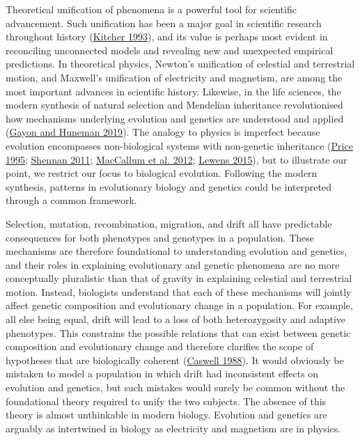 \documentclass[
]{article}
\begin{document}
Theoretical unification of phenomena is a powerful tool for scientific
advancement. Such unification has been a major goal in scientific
research throughout history (\protect\hyperlink{ref-Kitcher1993}{Kitcher
1993}), and its value is perhaps most evident in reconciling unconnected
models and revealing new and unexpected empirical predictions. In
theoretical physics, Newton's unification of celestial and terrestrial
motion, and Maxwell's unification of electricity and magnetism, are
among the most important advances in scientific history. Likewise, in
the life sciences, the modern synthesis of natural selection and
Mendelian inheritance revolutionised how mechanisms underlying evolution
and genetics are understood and applied
(\protect\hyperlink{ref-Gayon2019}{Gayon and Huneman 2019}). The analogy
to physics is imperfect because evolution encompasses non-biological
systems with non-genetic inheritance
(\protect\hyperlink{ref-Price1995}{Price 1995};
\protect\hyperlink{ref-Shennan2011}{Shennan 2011};
\protect\hyperlink{ref-MacCallum2012}{MacCallum et al. 2012};
\protect\hyperlink{ref-Lewens2015}{Lewens 2015}), but to illustrate our
point, we restrict our focus to biological evolution. Following the
modern synthesis, patterns in evolutionary biology and genetics could be
interpreted through a common framework.

Selection, mutation, recombination, migration, and drift all have
predictable consequences for both phenotypes and genotypes in a
population. These mechanisms are therefore foundational to understanding
evolution and genetics, and their roles in explaining evolutionary and
genetic phenomena are no more conceptually pluralistic than that of
gravity in explaining celestial and terrestrial motion. Instead,
biologists understand that each of these mechanisms will jointly affect
genetic composition and evolutionary change in a population. For
example, all else being equal, drift will lead to a loss of both
heterozygosity and adaptive phenotypes. This constrains the possible
relations that can exist between genetic composition and evolutionary
change and therefore clarifies the scope of hypotheses that are
biologically coherent (\protect\hyperlink{ref-Caswell1988}{Caswell
1988}). It would obviously be mistaken to model a population in which
drift had inconsistent effects on evolution and genetics, but such
mistakes would surely be common without the foundational theory required
to unify the two subjects. The absence of this theory is almost
unthinkable in modern biology. Evolution and genetics are arguably as
intertwined in biology as electricity and magnetism are in physics.
\end{document}

